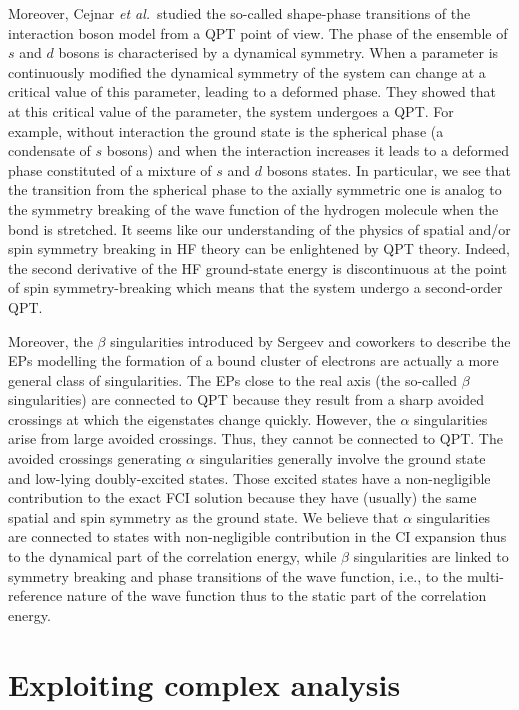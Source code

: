 \documentclass[aps,prb,reprint,noshowkeys,linenumbers,superscriptaddress]{revtex4-1}
\newcommand{\latin}[1]{#1}
\newcommand{\ie}{\latin{i.e.}}
\begin{document}
Moreover, Cejnar \textit{et al.}~studied the so-called shape-phase transitions of the interaction boson model from a QPT point of view. \cite{Cejnar_2000, Cejnar_2003, Cejnar_2007a, Cejnar_2009}
The phase of the ensemble of $s$ and $d$ bosons is characterised by a dynamical symmetry. 
When a parameter is continuously modified the dynamical symmetry of the system can change at a critical value of this parameter, leading to a deformed phase. 
They showed that at this critical value of the parameter, the system undergoes a QPT. 
For example, without interaction the ground state is the spherical phase (a condensate of $s$ bosons) and when the interaction increases it leads to a deformed phase constituted of a mixture of $s$ and $d$ bosons states. 
In particular, we see that the transition from the spherical phase to the axially symmetric one is analog to the symmetry breaking of the wave function of the hydrogen molecule when the bond is stretched. \cite{SzaboBook}
It seems like our understanding of the physics of spatial and/or spin symmetry breaking in HF theory can be enlightened by QPT theory. 
Indeed, the second derivative of the HF ground-state energy is discontinuous at the point of spin symmetry-breaking which means that the system undergo a second-order QPT. 

Moreover, the $\beta$ singularities introduced by Sergeev and coworkers to describe the EPs modelling the formation of a bound cluster of electrons are actually a more general class of singularities. 
The EPs close to the real axis (the so-called $\beta$ singularities) are connected to QPT because they result from a sharp avoided crossings at which the eigenstates change quickly. 
However, the $\alpha$ singularities arise from large avoided crossings. 
Thus, they cannot be connected to QPT. 
The avoided crossings generating $\alpha$ singularities generally involve the ground state and low-lying doubly-excited states. 
Those excited states have a non-negligible contribution to the exact FCI solution because they have (usually) the same spatial and spin symmetry as the ground state. 
We believe that $\alpha$ singularities are connected to states with non-negligible contribution in the CI expansion thus to the dynamical part of the correlation energy, while $\beta$ singularities are linked to symmetry breaking and phase transitions of the wave function, \ie, to the multi-reference nature of the wave function thus to the static part of the correlation energy.

\section{Exploiting complex analysis}
\end{document}

